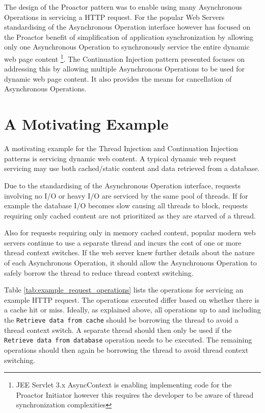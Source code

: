 \documentclass{article}
\begin{document}
The design of the Proactor pattern was to enable using many Asynchronous
Operations in servicing a HTTP request.  For the popular Web Servers
standardising of the Asynchronous Operation interface however has focused on the
Proactor benefit of simplification of application synchronization by allowing
only one Asynchronous Operation to synchronously service the entire dynamic web
page content \footnote{JEE Servlet 3.x AsyncContext is enabling implementing
code for the Proactor Initiator however this requires the developer to be aware
of thread synchronization complexities}.  The Continuation Injection pattern
presented focuses on addressing this by allowing multiple Asynchronous
Operations to be used for dynamic web page content. It also provides the means
for cancellation of Asynchronous Operations.


\section{A Motivating Example}

A motivating example for the Thread Injection and Continuation Injection
patterns is servicing dynamic web content.  A typical dynamic web request
servicing may use both cached/static content and data retrieved from a database.

Due to the standardising of the Asynchronous Operation interface, requests
involving no I/O or heavy I/O are serviced by the same pool of threads.
If for example the database I/O becomes slow causing all threads to block,
requests requiring only cached content are not prioritized as they are starved
of a thread.

Also for requests requiring only in memory cached content, popular modern web
servers continue to use a separate thread and incurs the cost of one or more
thread context switches.  If the web server knew further details about the
nature of each Asynchronous Operation, it should allow the Asynchronous
Operation to safely borrow the thread to reduce thread context switching.

Table \ref{tab:example_request_operations} lists the operations for servicing an
example HTTP request.  The operations executed differ based on whether there is
a cache hit or miss.  Ideally, as explained above, all operations up to and
including the \texttt{Retrieve data from cache} should be borrowing the thread
to avoid a thread context switch.  A separate thread should then only be used if
the \texttt{Retrieve data from database} operation needs to be executed.  The
remaining operations should then again be borrowing the thread to avoid thread
context switching.
\end{document}
